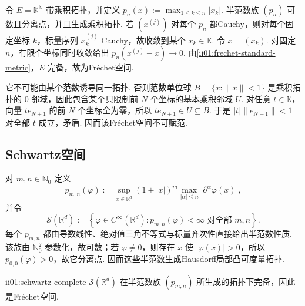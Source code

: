 \begin{FAExample}
令 \(\displaystyle E=\mathbb K^{\mathbb N}\) 带乘积拓扑，并定义
\(\displaystyle p_n(x) := \max_{1\leqslant k\leqslant n}|x_k|.\)
半范数族 \(\displaystyle (p_n)\) 可数且分离点，并且生成乘积拓扑. 若 \(\displaystyle (x^{(j)})\) 对每个 \(\displaystyle p_n\) 都Cauchy，则对每个固定坐标 \(\displaystyle k\)，标量序列 \(\displaystyle x_k^{(j)}\) Cauchy，故收敛到某个 \(\displaystyle x_k\in\mathbb K\). 令 \(\displaystyle x=(x_k)\). 对固定 \(\displaystyle n\)，有限个坐标同时收敛给出 \(\displaystyle p_n(x^{(j)}-x)\to0\). 由\autoref{ii01:frechet-standard-metric}，\(\displaystyle E\) 完备，故为Fr\'echet空间.

它不可能由某个范数诱导同一拓扑. 否则范数单位球 \(\displaystyle B=\{x:\|x\|<1\}\) 是乘积拓扑的 \(\displaystyle0\)-邻域，因此包含某个只限制前 \(\displaystyle N\) 个坐标的基本乘积邻域 \(\displaystyle U\). 对任意 \(\displaystyle t\in\mathbb K\)，向量 \(\displaystyle te_{N+1}\) 的前 \(\displaystyle N\) 个坐标全为零，所以 \(\displaystyle te_{N+1}\in U\subseteq B\). 于是 \(\displaystyle |t|\|e_{N+1}\|<1\) 对全部 \(\displaystyle t\) 成立，矛盾. 因而该Fr\'echet空间不可赋范.
\end{FAExample}

\subsection{Schwartz空间}

对 \(\displaystyle m,n\in\mathbb N_0\) 定义
\[
p_{m,n}(\varphi)
:=
\sup_{x\in\mathbb R^d}
(1+|x|)^m
\max_{|\alpha|\leqslant n}
|\partial^\alpha\varphi(x)|,
\]
并令
\[
\mathcal S(\mathbb R^d)
:=
\left\{
\varphi\in C^\infty(\mathbb R^d):
p_{m,n}(\varphi)<\infty
\text{ 对全部 }m,n
\right\}.
\]
每个 \(\displaystyle p_{m,n}\) 都由导数线性、绝对值三角不等式与标量齐次性直接给出半范数性质. 该族由 \(\displaystyle \mathbb N_0^2\) 参数化，故可数；若 \(\displaystyle \varphi\neq0\)，则存在 \(\displaystyle x\) 使 \(\displaystyle |\varphi(x)|>0\)，所以 \(\displaystyle p_{0,0}(\varphi)>0\)，故它分离点. 因而这些半范数生成Hausdorff局部凸可度量拓扑.

\begin{FATheorem}[B][Schwartz空间完备性]{ii01:schwartz-complete}
\(\displaystyle \mathcal S(\mathbb R^d)\) 在半范数族 \(\displaystyle (p_{m,n})\) 所生成的拓扑下完备，因此是Fr\'echet空间.
\end{FATheorem}

